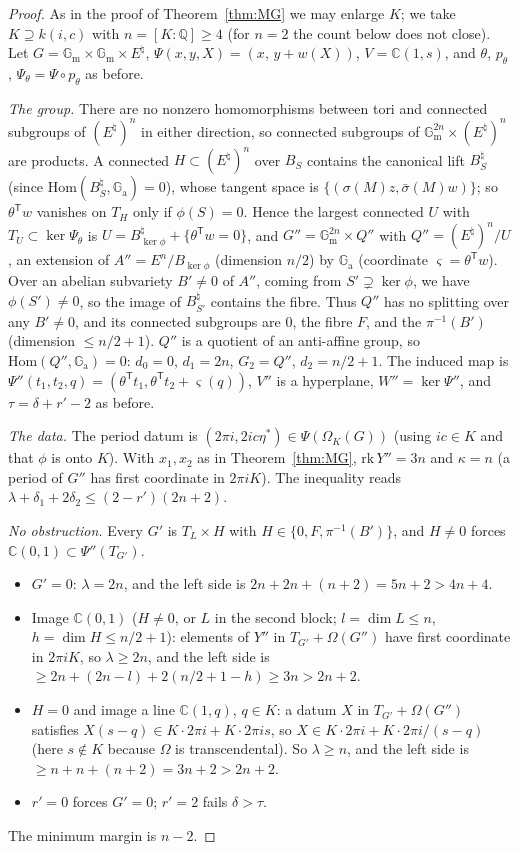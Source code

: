 \documentclass[11pt]{amsart}
\theoremstyle{definition}
\newcommand{\C}{\mathbb{C}}
\newcommand{\Q}{\mathbb{Q}}
\newcommand{\Ga}{\mathbb{G}_{\mathrm a}}
\newcommand{\Gm}{\mathbb{G}_{\mathrm m}}
\begin{document}
\begin{proof}
As in the proof of Theorem~\ref{thm:MG} we may enlarge $K$; we take $K\supseteq k(i,c)$ with $n=[K:\Q]\ge4$ (for $n=2$
the count below does not close). Let $G=\Gm\times\Gm\times E^\natural$, $\Psi(x,y,X)=(x,\,y+w(X))$, $V=\C(1,s)$, and
$\theta$, $p_\theta$, $\Psi_\theta=\Psi\circ p_\theta$ as before.

\emph{The group.} There are no nonzero homomorphisms between tori and connected subgroups of $(E^\natural)^n$ in either
direction, so connected subgroups of $\Gm^{2n}\times(E^\natural)^n$ are products. A connected $H\subset(E^\natural)^n$ over
$B_S$ contains the canonical lift $B_S^\natural$ (since $\mathrm{Hom}(B_S^\natural,\Ga)=0$), whose tangent space is
$\{(\sigma(M)z,\bar\sigma(M)w)\}$; so $\theta^{\mathsf T}w$ vanishes on $T_H$ only if $\phi(S)=0$. Hence the largest
connected $U$ with $T_U\subset\ker\Psi_\theta$ is $U=B^\natural_{\ker\phi}+\{\theta^{\mathsf T}w=0\}$, and $G''=\Gm^{2n}\times Q''$ with
$Q''=(E^\natural)^n/U$, an extension of $A''=E^n/B_{\ker\phi}$ (dimension $n/2$) by $\Ga$ (coordinate
$\varsigma=\theta^{\mathsf T}w$). Over an abelian subvariety $B'\ne0$ of $A''$, coming from $S'\supsetneq\ker\phi$, we have
$\phi(S')\neq0$, so the image of $B_{S'}^\natural$ contains the fibre. Thus $Q''$ has no splitting over any $B'\ne0$, and its
connected subgroups are $0$, the fibre $F$, and the $\pi^{-1}(B')$ (dimension $\le n/2+1$). $Q''$ is a quotient of an
anti-affine group, so $\mathrm{Hom}(Q'',\Ga)=0$: $d_0=0$, $d_1=2n$, $G_2=Q''$, $d_2=n/2+1$. The induced map is
$\Psi''(t_1,t_2,q)=(\theta^{\mathsf T}t_1,\theta^{\mathsf T}t_2+\varsigma(q))$, $V''$ is a hyperplane, $W''=\ker\Psi''$, and
$\tau=\delta+r'-2$ as before.

\emph{The data.} The period datum is $(2\pi i,2ic\eta^*)\in\Psi(\Omega_K(G))$ (using $ic\in K$ and that $\phi$ is onto
$K$). With $x_1,x_2$ as in Theorem~\ref{thm:MG}, $\mathrm{rk}\,Y''=3n$ and $\kappa=n$ (a period of $G''$ has first coordinate
in $2\pi iK$). The inequality reads $\lambda+\delta_1+2\delta_2\le(2-r')(2n+2)$.

\emph{No obstruction.} Every $G'$ is $T_L\times H$ with $H\in\{0,F,\pi^{-1}(B')\}$, and $H\ne0$ forces
$\C(0,1)\subset\Psi''(T_{G'})$.
\begin{itemize}
\item $G'=0$: $\lambda=2n$, and the left side is $2n+2n+(n+2)=5n+2>4n+4$.
\item Image $\C(0,1)$ ($H\ne0$, or $L$ in the second block; $l=\dim L\le n$, $h=\dim H\le n/2+1$): elements of $Y''$ in
$T_{G'}+\Omega(G'')$ have first coordinate in $2\pi iK$, so $\lambda\ge2n$, and the left side is
$\ge2n+(2n-l)+2(n/2+1-h)\ge3n>2n+2$.
\item $H=0$ and image a line $\C(1,q)$, $q\in K$: a datum $X$ in $T_{G'}+\Omega(G'')$ satisfies
$X(s-q)\in K\cdot2\pi i+K\cdot2\pi is$, so $X\in K\cdot2\pi i+K\cdot2\pi i/(s-q)$ (here $s\notin K$ because $\Omega$ is
transcendental). So $\lambda\ge n$, and the left side is $\ge n+n+(n+2)=3n+2>2n+2$.
\item $r'=0$ forces $G'=0$; $r'=2$ fails $\delta>\tau$.
\end{itemize}
The minimum margin is $n-2$.
\end{proof}
\end{document}
